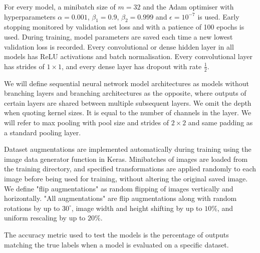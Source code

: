 \documentclass[12pt]{article}
\begin{document}
For every model, a minibatch size of $m=32$ and the Adam optimiser with hyperparameters $\alpha=0.001$, $\beta_1=0.9$, $\beta_2=0.999$ and $\epsilon=10^{-7}$ is used. Early stopping  monitored by validation set loss and with a patience of 100 epochs is used. During training, model parameters are saved each time a new lowest validation loss is recorded. Every convolutional or dense hidden layer in all models has ReLU activations and batch normalisation. Every convolutional layer has strides of $1 \times 1$, and every dense layer has dropout with rate $\frac{1}{2}$.

We will define sequential neural network model architectures as models without branching layers and branching architectures as the opposite, where outputs of certain layers are shared between multiple subsequent layers. We omit the depth when quoting kernel sizes. It is equal to the number of channels in the layer. We will refer to max pooling with pool size and strides of $2 \times 2$ and same padding as a standard pooling layer.

Dataset augmentations are implemented automatically during training using the image data generator function in Keras. Minibatches of images are loaded from the training directory, and specified transformations are applied randomly to each image before being used for training, without altering the original saved image. We define "flip augmentations" as random flipping of images vertically and horizontally. "All augmentations" are flip augmentations along with random rotations by up to $30^\circ$, image width and height shifting by up to $10\%$, and uniform rescaling by up to $20\%$.

The accuracy metric used to test the models is the percentage of outputs matching the true labels when a model is evaluated on a specific dataset.
\end{document}
